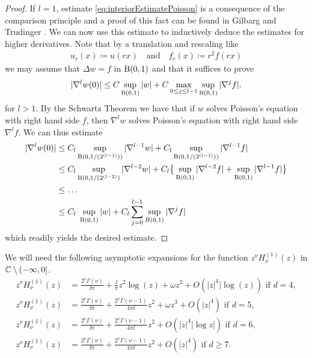 \begin{proof}
  If $l = 1$, estimate \eqref{eq:interiorEstimatePoisson} is a consequence of the comparison principle and a proof of this fact can be found in Gilbarg and Trudinger \cite[3.4]{gilbarg}.
  We can now use this estimate to inductively deduce the estimates for higher derivatives.
  Note that by a translation and rescaling like
  \begin{align*}
    u_r(x) \coloneqq u(rx) \quad\text{and}\quad f_r(x) \coloneqq r^2 f(rx)
  \end{align*}
  we may assume that $\Delta w = f$ in $\mathrm{B}(0,1)$ and that it suffices to prove
  \begin{align}
    \label{eq:interiorEstimatePoissonSimple}
    |\nabla^l w(0) | \leq C \sup_{\mathrm{B}(0,1)} |w| + C \max_{0 \leq j \leq l - 1} \sup_{\mathrm{B}(0,1)} |\nabla^j f|.
  \end{align}
  for $l > 1$.
  By the Schwartz Theorem we have that if $w$ solves Poisson's equation with right hand side $f$, then $\nabla^l w$ solves Poisson's equation with right hand side $\nabla^l f$.
  We can thus estimate
  \begin{align*}
    |\nabla^l w(0)|
    &\leq C_l \sup_{\mathrm{B}(0,1/(2^{(l - 1)}))} |\nabla^{l - 1} w| + C_l \sup_{\mathrm{B}(0,1/(2^{(l-1)}))} |\nabla^{l - 1} f| \\
    &\leq C_l \sup_{\mathrm{B}(0,1/(2^{(l-2)})} |\nabla^{l - 2} w| + C_l \big\{ \sup_{\mathrm{B}(0,1)} |\nabla^{l - 2} f| + \sup_{\mathrm{B}(0,1)} |\nabla^{l - 1} f| \big\} \\
    &\leq \dots \\
    &\leq C_l \; \sup_{\mathrm{B}(0,1)} |w| + C_l \sum_{j = 0}^{l - 1} \sup_{B(0,1)} |\nabla^j f|
  \end{align*}
  which readily yields the desired estimate.
\end{proof}

We will need the following asymptotic expansions for the function $z^\nu H_\nu^{(1)}(z)$ in $\mathbb{C} \setminus (-\infty, 0]$.
\begin{align}
  z^{\nu}H_\nu^{(1)}(z) &= \frac{2^\nu \Gamma(\nu)}{\ii \pi} + \frac{\ii}{\pi} z^2 \log(z) + \omega z^2 + O(|z|^4 |\log(z)) \text{ if } d = 4, \label{eq:asymptoticd4}\\
  z^{\nu} H_{\nu}^{(1)}(z) &= \frac{2^\nu \Gamma(\nu)}{\ii\pi} + \frac{2^\nu \Gamma(\nu - 1)}{4 \pi \ii} z^2 + \omega z^3 + O(|z|^4) \text{ if } d = 5, \label{eq:asymptoticd5}\\
  z^\nu H_\nu^{(1)}(z) &= \frac{2^\nu \Gamma(\nu)}{\ii \pi} + \frac{2^\nu \Gamma(\nu - 1)}{4\pi \ii}z^2 + O(|z|^4 |\log z|) \text{ if } d = 6,\label{eq:asymptoticd6} \\
  z^\nu H_\nu^{(1)}(z) &= \frac{2^\nu \Gamma(\nu)}{\ii \pi} + \frac{2^\nu \Gamma(\nu - 1)}{4 \pi \ii} z^2 + O(|z|^4) \text{ if } d \geq 7.\label{eq:asymptoticd7}
\end{align}

